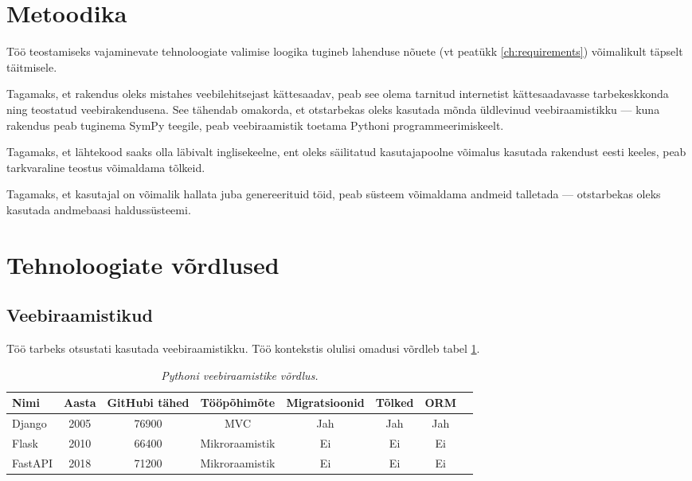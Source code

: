 \section{Metoodika}

Töö teostamiseks vajaminevate tehnoloogiate valimise loogika tugineb lahenduse nõuete (vt peatükk \ref{ch:requirements}) võimalikult täpselt täitmisele.


Tagamaks, et rakendus oleks mistahes veebilehitsejast kättesaadav, peab see olema tarnitud internetist kättesaadavasse tarbekeskkonda ning teostatud veebirakendusena. See tähendab omakorda, et otstarbekas oleks kasutada mõnda üldlevinud veebiraamistikku --- kuna rakendus peab tuginema SymPy teegile, peab veebiraamistik toetama Pythoni programmeerimiskeelt.

Tagamaks, et lähtekood saaks olla läbivalt inglisekeelne, ent oleks säilitatud kasutajapoolne võimalus kasutada rakendust eesti keeles, peab tarkvaraline teostus võimaldama tõlkeid.

Tagamaks, et kasutajal on võimalik hallata juba genereerituid töid, peab süsteem võimaldama andmeid talletada — otstarbekas oleks kasutada andmebaasi haldussüsteemi.

\section{Tehnoloogiate võrdlused}

\subsection{Veebiraamistikud}

Töö tarbeks otsustati kasutada veebiraamistikku. Töö kontekstis olulisi omadusi võrdleb tabel \ref{tab:web-framework-comparison}.

\begin{longtable}{|l|c|c|c|c|c|c|c|}
  \caption{\emph{Pythoni veebiraamistike võrdlus.}}\\ \hline
  \label{tab:web-framework-comparison}
  \textbf{Nimi} & \textbf{Aasta} & \textbf{GitHubi tähed} & \textbf{Tööpõhimõte} & \textbf{Migratsioonid} & \textbf{Tõlked} & \textbf{ORM}\\ \hline
  Django & 2005 \cite{django-faq-why} & 76900 \cite{django-github-repo} & MVC \cite{django-faq-mvc} & Jah & Jah & Jah \\ \hline
  Flask & 2010 \cite{flask-v1} & 66400 \cite{flask-github-repo} & Mikroraamistik \cite{flask-whats-micro} & Ei & Ei & Ei \\ \hline
  FastAPI & 2018 \cite{fastapi-github-commit-log} & 71200 \cite{fastapi-github-repo} & Mikroraamistik \cite{fastapi-microframework} & Ei & Ei & Ei \\ \hline
\end{longtable}


